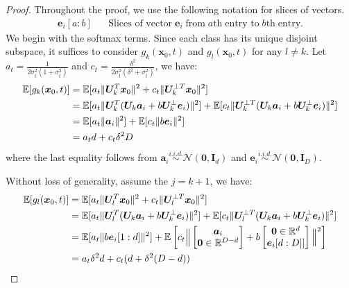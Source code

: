 \begin{proof}
    Throughout the proof, we use the following notation for slices of vectors.
    \begin{align*}
        \bm e_i [a:b] \;\;\;\;\;\; \text{Slices of vector} \; \bm e_i \; \text{from} \; a\text{th} \;\text{entry to} \; b\text{th} \; \text{entry.} 
    \end{align*}
    We begin with the softmax terms. Since each class has its unique disjoint subspace, it suffices to consider $g_k(\bm x_0, t)$ and $g_l(\bm x_0, t)$ for any $l \neq k$. Let $a_t = \frac{1}{2\sigma_t^2(1 + \sigma_t^2)}$ and $c_t = \frac{\delta^2}{2\sigma_t^2(\delta^2 + \sigma_t^2)}$, we have:
    \begin{align*}
        \operatorname{\mathbb{E}}[g_k(\bm x_0, t)] &= \operatorname{\mathbb{E}}[a_t \| \bm U_k^T \bm x_0 \|^2 + c_t \| \bm U_k^{\perp T} \bm x_0 \|^2] \\
        &= \operatorname{\mathbb{E}}[a_t \| \bm U_k^T (\bm U_k \bm a_i + b\bm U_k^{\perp} \bm e_i) \|^2] + \operatorname{\mathbb{E}}[c_t \|\bm U_k^{\perp T} (\bm U_k \bm a_i + b\bm U_k^{\perp} \bm e_i)\|^2] \\
        &= \operatorname{\mathbb{E}}[a_t\|\bm a_i\|^2] + \operatorname{\mathbb{E}}[c_t\|b \bm e_i\|^2] \\
        & = a_t d + c_t \delta^2 D
    \end{align*}
    where the last equality follows from $\bm a_i \overset{i.i.d.}{\sim} \mathcal{N}(\bm 0, \bm I_{d})$ and $\bm e_i \overset{i.i.d.}{\sim} \mathcal{N}(\bm 0, \bm I_{D})$. 
    
    Without loss of generality, assume the $j=k+1$, we have:
    \begin{align*}
        \operatorname{\mathbb{E}}[g_l(\bm x_0, t)] &= \operatorname{\mathbb{E}}[a_t \| \bm U_l^T \bm x_0 \|^2 + c_t \| \bm U_l^{\perp T} \bm x_0 \|^2] \\
        &= \operatorname{\mathbb{E}}[a_t \| \bm U_l^T (\bm U_k \bm a_i + b\bm U_k^{\perp} \bm e_i) \|^2] + \operatorname{\mathbb{E}}[c_t \|\bm U_l^{\perp T} (\bm U_k \bm a_i + b\bm U_k^{\perp} \bm e_i)\|^2] \\
        &= \operatorname{\mathbb{E}}[a_t\|b\bm e_i [1:d]\|^2] + \operatorname{\mathbb{E}}\left[c_t \Big\| \begin{bmatrix}
            \bm a_i \\
            \bm 0 \in \mathbb{R}^{D-d}
        \end{bmatrix} + b \begin{bmatrix}
            \bm 0 \in \mathbb{R}^{d} \\
            \bm e_i [d:D]]
        \end{bmatrix} \Big\|^2 \right] \\
        & = a_t \delta^2 d + c_t(d + \delta^2 (D-d))
    \end{align*}


\end{proof}
